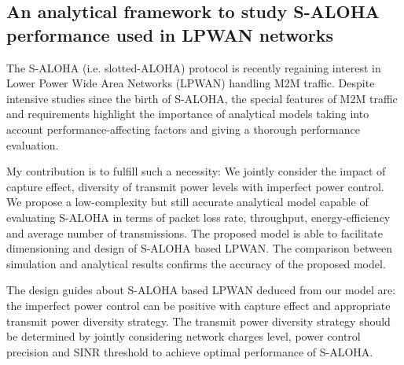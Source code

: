 
\subsection{An analytical framework to study S-ALOHA performance used in LPWAN networks}
The S-ALOHA (i.e. slotted-ALOHA) protocol is recently regaining interest in Lower Power Wide Area Networks (LPWAN) handling M2M traffic. Despite intensive studies since the birth of S-ALOHA, the special features of M2M traffic and requirements highlight the importance of analytical models taking into account performance-affecting factors and giving a thorough performance evaluation. 

My contribution is to fulfill such a necessity: We jointly consider the impact of capture effect, diversity of transmit power levels with imperfect power control. We propose a low-complexity but still accurate analytical model capable of evaluating S-ALOHA in terms of packet loss rate, throughput, energy-efficiency and average number of transmissions. The proposed model is able to facilitate dimensioning and design of S-ALOHA based LPWAN. The comparison between simulation and analytical results confirms the accuracy of the proposed model. 

The design guides about S-ALOHA based LPWAN deduced from our model are: the imperfect power control can be positive with capture effect and appropriate transmit power diversity strategy. The transmit power diversity strategy should be determined by jointly considering network charges level, power control precision and SINR threshold to achieve optimal performance of S-ALOHA.

